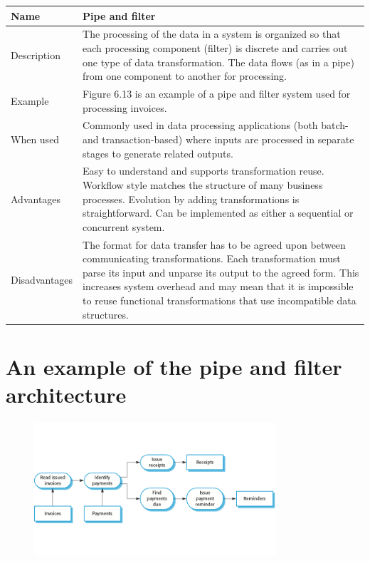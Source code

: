\begin{table}[h!]
\centering
\begin{tabular}{ |p{3cm}|p{8cm}|  }
\hline
Name & Pipe and filter\\
\hline
\hline
Description & The processing of the data in a system is organized so that each processing component (filter) is discrete and carries out one type of data transformation. The data flows (as in a pipe) from one component to another for processing.\\
\hline
Example & Figure 6.13 is an example of a pipe and filter system used for processing invoices.\\
\hline
When used & Commonly used in data processing applications (both batch- and transaction-based) where inputs are processed in separate stages to generate related outputs.\\
\hline
Advantages & Easy to understand and supports transformation reuse. Workflow style matches the structure of many business processes. Evolution by adding transformations is straightforward. Can be implemented as either a sequential or concurrent system.\\
\hline
Disadvantages & The format for data transfer has to be agreed upon between communicating transformations. Each transformation must parse its input and unparse its output to the agreed form. This increases system overhead and may mean that it is impossible to reuse functional transformations that use incompatible data structures.\\
\hline
\end{tabular}

\label{table:T2_3}
\end{table}

\newpage
\section{An example of the pipe and filter architecture}
\begin{figure}[h!]
    \centering
    \includegraphics[width = 0.8\textwidth]{./figures/L3_8.png}
    \caption{}
    \label{fig:L3_8}
\end{figure}


